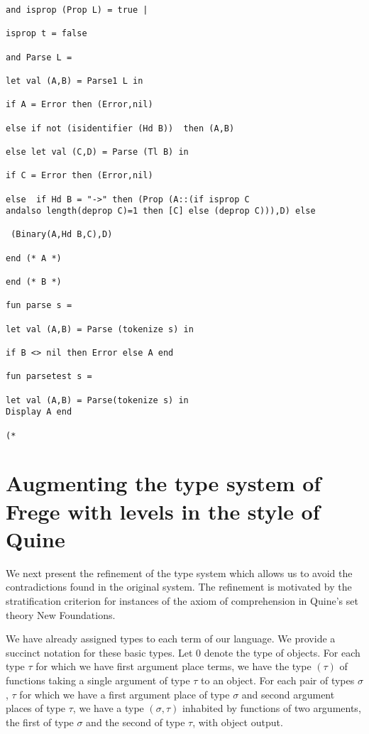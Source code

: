 \documentclass{article}
\begin{document}
{{\begin{verbatim}
and isprop (Prop L) = true |

isprop t = false

and Parse L =

let val (A,B) = Parse1 L in

if A = Error then (Error,nil)

else if not (isidentifier (Hd B))  then (A,B)

else let val (C,D) = Parse (Tl B) in

if C = Error then (Error,nil) 

else  if Hd B = "->" then (Prop (A::(if isprop C 
andalso length(deprop C)=1 then [C] else (deprop C))),D) else

 (Binary(A,Hd B,C),D)

end (* A *)

end (* B *)

fun parse s =

let val (A,B) = Parse (tokenize s) in 

if B <> nil then Error else A end

fun parsetest s =

let val (A,B) = Parse(tokenize s) in
Display A end

(*

\end{verbatim}

\newpage

\section{Augmenting the type system of Frege with levels in the style of Quine}

We next present the refinement of the type system which allows us to avoid the contradictions found in the original system.  The refinement is motivated by the stratification criterion for instances of the axiom of comprehension in Quine's set theory New Foundations.

We have already assigned types to each term of our language.  We provide a succinct notation for these basic types.  Let 0 denote the type of objects.
For each type $\tau$ for which we have first argument place terms, we have the type $(\tau)$ of functions taking a single argument of type $\tau$ to an object.  For each pair of types $\sigma$, $\tau$ for which we have a first argument place of type $\sigma$ and second argument places of type $\tau$,
we have a type $(\sigma,\tau)$ inhabited by functions of two arguments, the first of type $\sigma$ and the second of type $\tau$, with object output.

}}
\end{document}
